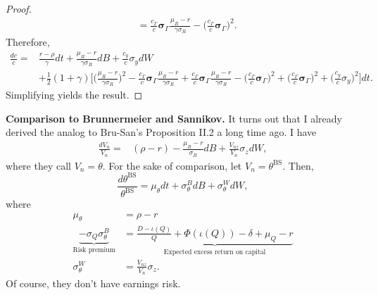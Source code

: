 \documentclass[11pt]{extarticle}
\theoremstyle{plain}
\theoremstyle{definition}
\begin{document}
\begin{proof}
\begin{align*}
		&= \frac{c_\Gamma }{c}  \bm \sigma_\Gamma \frac{\mu_R - r}{\gamma \sigma_R } -\bigg( \frac{c_\Gamma}{c}  \bm \sigma_\Gamma  \bigg)^2.
	\end{align*}
	Therefore, 
	\begin{align*}
		\frac{dc}{c} = & \frac{r - \rho}{\gamma} dt +  \frac{\mu_R - r}{\gamma \sigma_R} dB  + \frac{c_y}{c} \sigma_y dW \\
		&+ \frac{1}{2} (1+\gamma) \bigg[ \bigg( \frac{\mu_R - r}{\gamma \sigma_R} \bigg)^2  - \frac{c_\Gamma }{c} \bm \sigma_\Gamma \frac{\mu_R - r}{\gamma \sigma_R} + \frac{c_\Gamma }{c}  \bm \sigma_\Gamma \frac{\mu_R - r}{\gamma \sigma_R } -\bigg( \frac{c_\Gamma}{c}  \bm \sigma_\Gamma  \bigg)^2 + \bigg( \frac{c_\Gamma}{c} \bm \sigma_\Gamma \bigg)^2 + \bigg( \frac{c_y}{c} \sigma_y \bigg)^2 \bigg] dt.
	\end{align*}
	Simplifying yields the result. 
	
\end{proof}




\vspace{5mm}
\noindent
\textbf{Comparison to Brunnermeier and Sannikov.} It turns out that I already derived the analog to Bru-San's Proposition II.2 a long time ago. I have 
\begin{align*}
	\frac{dV_n}{V_n} = & (\rho - r)  -   \frac{\mu_R - r}{\sigma_R} dB  + \frac{V_{nz}}{V_n} \sigma_z dW,
\end{align*}
where they call $V_n = \theta$. For the sake of comparison, let $V_n = \theta^\text{BS}$. Then, 
\begin{equation*}
	\frac{d \theta^\text{BS}}{\theta^\text{BS}} = \mu_\theta dt + \sigma_\theta^B dB + \sigma_\theta^W dW,
\end{equation*}
where 
\begin{align*}
	\mu_\theta  &= \rho - r \\
	\underbrace{- \sigma_Q \sigma_\theta^B }_\text{Risk premium} &= \underbrace{ \frac{D - \iota (Q) }{Q}  + \Phi(\iota(Q)) - \delta + \mu_Q  - r }_\text{Expected excess return on capital} \\
	\sigma_\theta^W  &= \frac{V_{nz}}{V_n} \sigma_z .
\end{align*}
Of course, they don't have earnings risk. 





\vspace{10mm}
\end{document}
